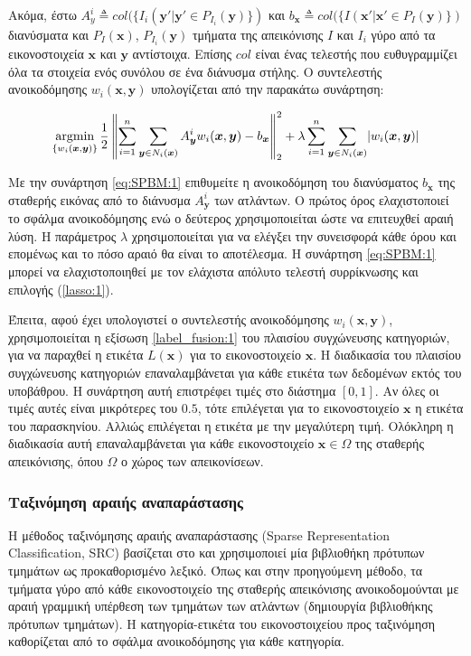 \documentclass[a4paper,12pt]{article}
\newcommand{\argminB}{\mathop{\mathrm{argmin}}}
\DeclarePairedDelimiter\abs{\lvert}{\rvert}
\newcommand\norm[1]{\left\lVert#1\right\rVert}
\begin{document}
Ακόμα, έστω $A^i_y \triangleq col(\{I_i(\bm{y'} | \bm{y'} \in
P_{I_i}(\bm{y})\})$ και $b_{\bm{x}} \triangleq col( \{ I(\bm{x'} | \bm{x'} \in
P_{I}(\bm{y})\})$ διανύσματα και $P_{I}(\bm{x})$, $P_{I_i}(\bm{y})$ τμήματα της
απεικόνισης $I$ και $I_i$ γύρο από τα εικονοστοιχεία $\bm{x}$ και $\bm{y}$
αντίστοιχα. Επίσης $col$ είναι ένας τελεστής που ευθυγραμμίζει όλα τα στοιχεία
ενός συνόλου σε ένα διάνυσμα στήλης. Ο συντελεστής ανοικοδόμησης
$w_i(\bm{x},\bm{y})$ υπολογίζεται από την παρακάτω συνάρτηση:

\begin{equation} \label{eq:SPBM:1}
    \argminB_{\{w_i(\bm{x},\bm{y})\}} { \frac{1} {2} \norm {\sum_{i=1}^{n}
    \sum_{\bm{y} \in N_i(\bm{x})} A_{\bm{y}}^i w_i(\bm{x},\bm{y}) -
    b_{\bm{x}}}_2^2 }
    + \lambda \sum_{i=1}^{n} \sum_{\bm{y} \in N_i(\bm{x})}
    \abs{w_i(\bm{x},\bm{y})}
\end{equation}

Με την συνάρτηση \eqref{eq:SPBM:1} επιθυμείτε η ανοικοδόμηση του διανύσματος
$b_{\bm{x}}$ της σταθερής εικόνας από το διάνυσμα $A^i_{\bm{y}}$ των ατλάντων. Ο
πρώτος όρος ελαχιστοποιεί το σφάλμα ανοικοδόμησης ενώ ο δεύτερος χρησιμοποιείται
ώστε να επιτευχθεί αραιή λύση. Η παράμετρος $\lambda$ χρησιμοποιείται για να
ελέγξει την συνεισφορά κάθε όρου και επομένως και το πόσο αραιό θα είναι το
αποτέλεσμα. Η συνάρτηση \eqref{eq:SPBM:1} μπορεί να ελαχιστοποιηθεί με τον
ελάχιστα απόλυτο τελεστή συρρίκνωσης και επιλογής (\ref{lasso:1}).

Έπειτα, αφού έχει υπολογιστεί ο συντελεστής ανοικοδόμησης $w_i(\bm{x},\bm{y})$, 
χρησιμοποιείται η εξίσωση \eqref{label_fusion:1} του πλαισίου συγχώνευσης
κατηγοριών, για να παραχθεί η ετικέτα $L(\bm{x})$ για το εικονοστοιχείο
$\bm{x}$.  Η διαδικασία του πλαισίου συγχώνευσης κατηγοριών επαναλαμβάνεται για
κάθε ετικέτα των δεδομένων εκτός του υποβάθρου. Η συνάρτηση αυτή επιστρέφει
τιμές στο διάστημα $[0,1]$. Αν όλες οι τιμές αυτές είναι μικρότερες του $0.5$,
τότε επιλέγεται για το εικονοστοιχείο $\bm{x}$ η ετικέτα του παρασκηνίου. Αλλιώς
επιλέγεται η ετικέτα με την μεγαλύτερη τιμή. Ολόκληρη η διαδικασία αυτή
επαναλαμβάνεται για κάθε εικονοστοιχείο $\bm{x} \in \Omega$ της σταθερής
απεικόνισης, όπου $\Omega$ ο χώρος των απεικονίσεων.


\subsubsection{Ταξινόμηση αραιής αναπαράστασης} \label{SRC:1}

Η μέθοδος ταξινόμησης αραιής αναπαράστασης (Sparse Representation
Classification, SRC) βασίζεται στο \cite{Tong:1} και χρησιμοποιεί μία βιβλιοθήκη
πρότυπων τμημάτων ως προκαθορισμένο λεξικό. Όπως και στην προηγούμενη μέθοδο, τα
τμήματα γύρο από κάθε εικονοστοιχείο της σταθερής απεικόνισης ανοικοδομούνται με
αραιή γραμμική υπέρθεση των τμημάτων των ατλάντων (δημιουργία βιβλιοθήκης
πρότυπων τμημάτων). Η κατηγορία-ετικέτα του εικονοστοιχείου προς ταξινόμηση
καθορίζεται από το σφάλμα ανοικοδόμησης για κάθε κατηγορία.
\end{document}
